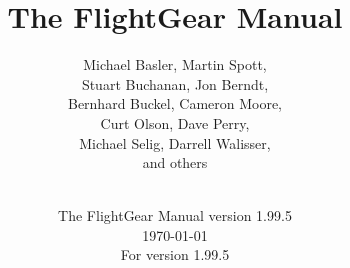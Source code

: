 
\title{The FlightGear Manual}

\author{
  Michael Basler, Martin Spott,\\
  Stuart Buchanan, Jon Berndt,\\
  Bernhard Buckel, Cameron Moore,\\
  Curt Olson, Dave Perry,\\
  Michael Selig, Darrell Walisser,\\
  and others\\
{ \setlength{\fboxsep}{12mm}\setlength{\fboxrule}{0pt}
 \centerline{}}}

\date{The FlightGear Manual version 1.99.5\\
\today\\
For \FlightGear{} version 1.99.5}


